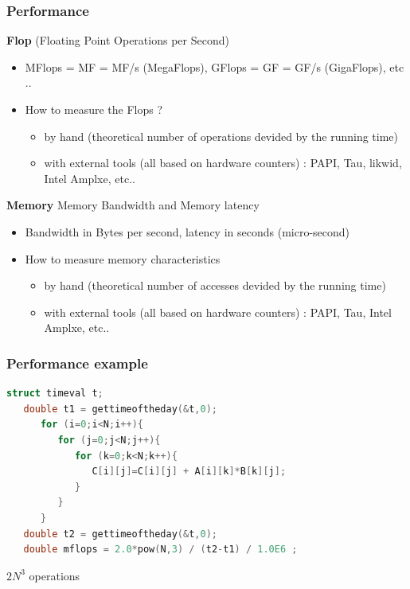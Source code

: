 \begin{frame}
	\frametitle{Performance}

{\bf Flop} (Floating Point Operations per Second)

	\begin{itemize}
	\item MFlops = MF = MF/s (MegaFlops), GFlops = GF = GF/s (GigaFlops), etc ..
	\item How to measure the Flops ?
		\begin{itemize}
			\item by hand (theoretical number of operations devided by the running time)
			\item with external tools (all based on hardware counters) : PAPI, Tau, likwid, Intel Amplxe, etc..
		\end{itemize}
	\end{itemize}

{\bf Memory} Memory Bandwidth and Memory latency

	\begin{itemize}
	\item Bandwidth in Bytes per second, latency in seconds (micro-second)
	\item How to measure memory characteristics
		\begin{itemize}
			\item by hand (theoretical number of accesses devided by the running time)
			\item with external tools (all based on hardware counters) : PAPI, Tau, Intel Amplxe, etc..
		\end{itemize}
	\end{itemize}
\end{frame}


\begin{frame}[containsverbatim]
	\frametitle{Performance example}

\begin{lstlisting}[language=C,frame=lines]
   struct timeval t;
   double t1 = gettimeoftheday(&t,0);
      for (i=0;i<N;i++){
         for (j=0;j<N;j++){
            for (k=0;k<N;k++){
               C[i][j]=C[i][j] + A[i][k]*B[k][j];
            }
         }
      }
   double t2 = gettimeoftheday(&t,0);
   double mflops = 2.0*pow(N,3) / (t2-t1) / 1.0E6 ;
\end{lstlisting}

$2 N^3$ operations

\end{frame}


